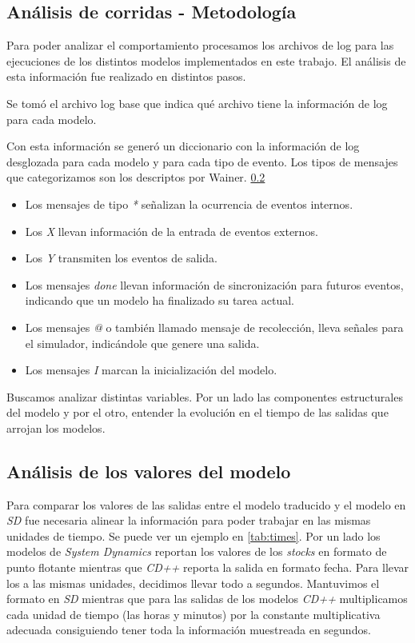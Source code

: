 
\subsection{Análisis de corridas - Metodología}

Para poder analizar el comportamiento procesamos los archivos de log para las ejecuciones de los distintos modelos implementados en este trabajo.
El análisis de esta información fue realizado en distintos pasos.

Se tomó el archivo log base que indica qué archivo tiene la información de log para cada modelo.

Con esta información se generó un diccionario con la información de log desglozada para cada modelo y para cada tipo de evento. Los tipos de mensajes que categorizamos son los descriptos por Wainer. \ref{}

\begin{itemize}
    \item Los mensajes de tipo \textit{*} señalizan la ocurrencia de eventos internos.
    \item Los \textit{X} llevan información de la entrada de eventos externos.
    \item Los \textit{Y} transmiten los eventos de salida.
    \item Los mensajes \textit{done} llevan información de sincronización para futuros eventos, indicando que un modelo ha finalizado su tarea actual.
    \item Los mensajes  \textit{@} o también llamado mensaje de recolección,
        lleva señales para el simulador, indicándole que genere una salida.
    \item Los mensajes \textit{I} marcan la inicialización del modelo.
\end{itemize}

Buscamos analizar distintas variables. Por un lado las componentes
estructurales del modelo y por el otro, entender la evolución en el tiempo de
las salidas que arrojan los modelos.


\subsection{Análisis de los valores del modelo}

Para comparar los valores de las salidas entre el modelo traducido y el modelo
en \textit{SD} fue necesaria alinear la información para poder trabajar en las
mismas unidades de tiempo. Se puede ver un ejemplo en \ref{tab:times}. Por un lado los modelos de \textit{System Dynamics} reportan
los valores de los \textit{stocks} en formato de punto flotante mientras que \textit{CD++}
reporta la salida en formato fecha. Para llevar los a las mismas unidades,
decidimos llevar todo a segundos. Mantuvimos el formato en \textit{SD} mientras que para las salidas de los modelos \textit{CD++} multiplicamos cada unidad de tiempo (las horas y minutos) por la constante multiplicativa adecuada consiguiendo tener toda la información muestreada en segundos.

